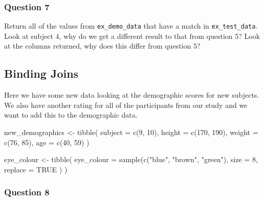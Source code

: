\documentclass[
]{book}
\newenvironment{Shaded}{\begin{snugshade}}{\end{snugshade}}
\newcommand{\AttributeTok}[1]{\textcolor[rgb]{0.77,0.63,0.00}{#1}}
\newcommand{\ConstantTok}[1]{\textcolor[rgb]{0.00,0.00,0.00}{#1}}
\newcommand{\DecValTok}[1]{\textcolor[rgb]{0.00,0.00,0.81}{#1}}
\newcommand{\FunctionTok}[1]{\textcolor[rgb]{0.00,0.00,0.00}{#1}}
\newcommand{\NormalTok}[1]{#1}
\newcommand{\OtherTok}[1]{\textcolor[rgb]{0.56,0.35,0.01}{#1}}
\newcommand{\StringTok}[1]{\textcolor[rgb]{0.31,0.60,0.02}{#1}}
\begin{document}
\hypertarget{question-7-3}{%
\subsubsection{Question 7}\label{question-7-3}}

Return all of the values from \texttt{ex\_demo\_data} that have a match in \texttt{ex\_test\_data}. Look at subject 4, why do we get a different result to that from question 5? Look at the columns returned, why does this differ from question 5?

\hypertarget{binding-joins-1}{%
\subsection{Binding Joins}\label{binding-joins-1}}

Here we have some new data looking at the demographic scores for new subjects. We also have another rating for all of the participants from our study and we want to add this to the demographic data.

\begin{Shaded}
\begin{Highlighting}[]
\NormalTok{new\_demographics }\OtherTok{\textless{}{-}} \FunctionTok{tibble}\NormalTok{(}
  \AttributeTok{subject =} \FunctionTok{c}\NormalTok{(}\DecValTok{9}\NormalTok{, }\DecValTok{10}\NormalTok{),}
  \AttributeTok{height =} \FunctionTok{c}\NormalTok{(}\DecValTok{170}\NormalTok{, }\DecValTok{190}\NormalTok{),}
  \AttributeTok{weight =} \FunctionTok{c}\NormalTok{(}\DecValTok{76}\NormalTok{, }\DecValTok{85}\NormalTok{),}
  \AttributeTok{age =} \FunctionTok{c}\NormalTok{(}\DecValTok{40}\NormalTok{, }\DecValTok{59}\NormalTok{)}
\NormalTok{  )}

\NormalTok{eye\_colour }\OtherTok{\textless{}{-}} \FunctionTok{tibble}\NormalTok{(}
  \AttributeTok{eye\_colour =} \FunctionTok{sample}\NormalTok{(}\FunctionTok{c}\NormalTok{(}\StringTok{"blue"}\NormalTok{, }\StringTok{"brown"}\NormalTok{, }\StringTok{"green"}\NormalTok{), }
                      \AttributeTok{size =} \DecValTok{8}\NormalTok{, }
                      \AttributeTok{replace =} \ConstantTok{TRUE}
\NormalTok{                      )}
\NormalTok{  )}
\end{Highlighting}
\end{Shaded}

\hypertarget{question-8-3}{%
\subsubsection{Question 8}\label{question-8-3}}
\end{document}

